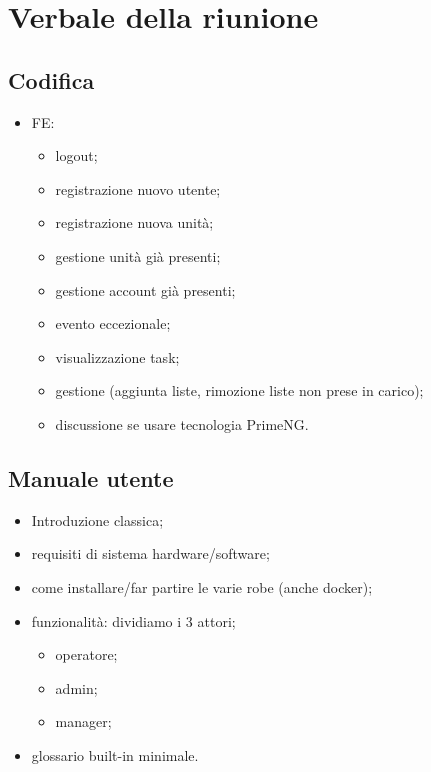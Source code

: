 \section{Verbale della riunione}

\subsection{Codifica}
\begin{itemize}
	\item FE:
	\begin{itemize}
		\item logout;
		
		\item registrazione nuovo utente;
		
		\item registrazione nuova unità;
		
		\item gestione unità già presenti;
		
		\item gestione account già presenti;
		
		\item evento eccezionale;
		
		\item visualizzazione task;
		
		\item gestione (aggiunta liste, rimozione liste non prese in carico);
		
		\item discussione se usare tecnologia PrimeNG.
	\end{itemize}
\end{itemize}

\subsection{Manuale utente}
	\begin{itemize}
		\item Introduzione classica;
		
		\item requisiti di sistema hardware/software;
		
		\item come installare/far partire le varie robe (anche docker);
		
		\item funzionalità: dividiamo i 3 attori;
		\begin{itemize}
			\item operatore;
		
			\item admin;
		
			\item manager;
		\end{itemize}
		
		\item glossario built-in minimale.
	\end{itemize}

